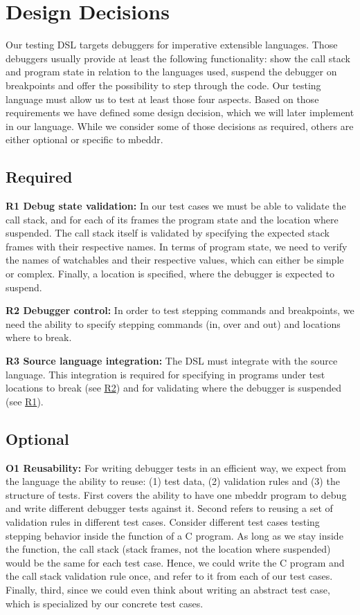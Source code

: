 \section{Design Decisions}

Our testing \ac{DSL} targets debuggers for imperative extensible languages.
Those debuggers usually provide at least the following functionality:
show the call stack and program state in relation to the languages used, 
suspend the debugger on breakpoints and offer the possibility to 
step through the code. Our testing language must allow us to test at least those
four aspects. Based on those requirements we have defined some design
decision, which we will later implement in our language. While we consider 
some of those decisions as required, others are either optional or specific to mbeddr.

\subsection{Required}

\noindent \textbf{\label{R1}R1 Debug state validation:} In our test cases we
must be able to validate the call stack, and for each of its frames 
the program state and the location where suspended. 
The call stack itself is validated by specifying the expected stack
frames with their respective names. In terms of program state, we need to verify
the names of watchables and their respective values, which can either be simple
or complex. 
Finally, a location is specified, where the debugger is expected to suspend.

\noindent \textbf{\label{R2}R2 Debugger control:} In order to test stepping
commands and breakpoints, we need the ability to specify stepping commands
(in, over and out) and locations where to break.

\noindent \textbf{\label{R3}R3 Source language integration:} The
\ac{DSL} must integrate with the source language.
This integration is required for specifying in programs under test
locations to break (see \hyperref[R2]{R2}) and for validating where the debugger is suspended
(see \hyperref[R1]{R1}).

\subsection{Optional}
\noindent \textbf{\label{O1}O1 Reusability:} For writing debugger tests in
an efficient way, we expect from the language the ability to reuse: (1) test
data, (2) validation rules and (3) the structure of tests. First covers the ability to
have one mbeddr program to debug and write different debugger tests against
it. Second refers to reusing a set of validation rules in different test cases.
Consider different test cases testing stepping behavior inside the  
function of a C program.
As long as we stay inside the function, the call stack (stack frames, not the
location where suspended) would be the same for each test case. Hence, we could
write the C program and the call stack validation rule once, and refer to it
from each of our test cases. Finally, third, since we could even think about
writing an abstract test case, which is specialized by our concrete test cases.

